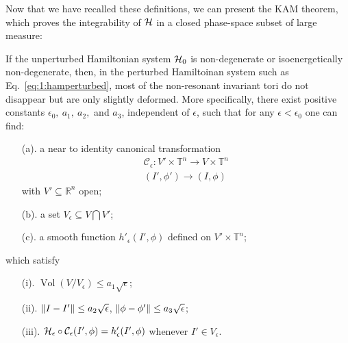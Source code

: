 Now that we have recalled these definitions, we can present the KAM theorem, which proves the integrability of $\mathcal{H}$ in a closed phase-space subset of large measure:
\begin{theorem}\label{th:kam}
If the unperturbed Hamiltonian system $\mathcal{H}_0$ is non-degenerate or isoenergetically non-degenerate, then, in the perturbed Hamiltoinan system such as Eq.~\eqref{eq:1:hamperturbed}, most of the non-resonant invariant tori do not disappear but are only slightly deformed. More specifically, there exist positive constants $\epsilon_0,\ a_1,\ a_2,$ and $a_3$, independent of $\epsilon$, such that for any $\epsilon < \epsilon_0$ one can find:
\begin{enumerate}
    \item [(a).] a near to identity canonical transformation
    \begin{equation}
        \begin{array}{r}
        \mathcal{C}_\epsilon: V'\times\mathbb{T}^{n} \longrightarrow V\times\mathbb{T}^n \\
        (I', \phi') \longrightarrow(I, \phi)
        \end{array}
    \end{equation}
    with $V' \subseteq \mathbb{R}^n$ open;
    \item [(b).] a set $V_\epsilon \subseteq V \bigcap V'$;
    \item [(c).] a smooth function $h'_\epsilon(I', \phi)$ defined on $V'\times \mathbb{T}^n$;
\end{enumerate}
which satisfy
\begin{enumerate}
    \item [(i).] $\operatorname{Vol}(V/V_\epsilon) \leq a_1\sqrt{\epsilon}$;
    \item [(ii).] $\norm{I-I'}\leq a_2 \sqrt{\epsilon}$, $\norm{\phi - \phi'} \leq a_3 \sqrt{\epsilon}$;
    \item [(iii).] $\mathcal{H}_\epsilon \circ \mathcal{C}_\epsilon (I', \phi) = h'_\epsilon (I', \phi)$ whenever $I'\in V_\epsilon$.
\end{enumerate}

\end{theorem}

